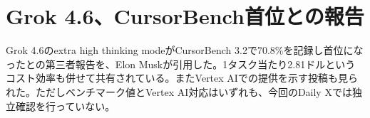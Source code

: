 \section{Grok 4.6、CursorBench首位との報告}
Grok 4.6のextra high thinking modeがCursorBench 3.2で70.8\%を記録し首位になったとの第三者報告を、Elon Muskが引用した。1タスク当たり2.81ドルというコスト効率も併せて共有されている。またVertex AIでの提供を示す投稿も見られた。ただしベンチマーク値とVertex AI対応はいずれも、今回のDaily Xでは独立確認を行っていない。
